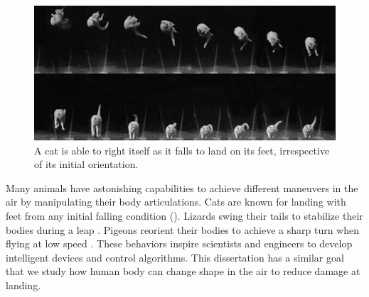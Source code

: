 \begin{figure}[htbp]
\center
  \includegraphics[width=\linewidth]{images/related_cat.jpg}
  \caption{A cat is able to right itself as it falls to land on 
  its feet, irrespective of its initial orientation.}
 \label{fig:related_cat}
\end{figure}

Many animals have astonishing capabilities to achieve different
maneuvers in the air by manipulating their body articulations.  Cats
are known for landing with feet from any initial falling condition
\cite{Kane:1969:DEF,Montgomery:1993:GTF,Cat:2015:URL}
(). Lizards swing their tails to
stabilize their bodies during a leap \cite{Libby:2012:TAP}. Pigeons
reorient their bodies to achieve a sharp turn when flying at low speed
\cite{Ros:2011:PSL}. These behaviors inspire scientists and engineers
to develop intelligent devices and control algorithms. This dissertation has a
similar goal that we study how human body can change shape in the
air to reduce damage at landing.


